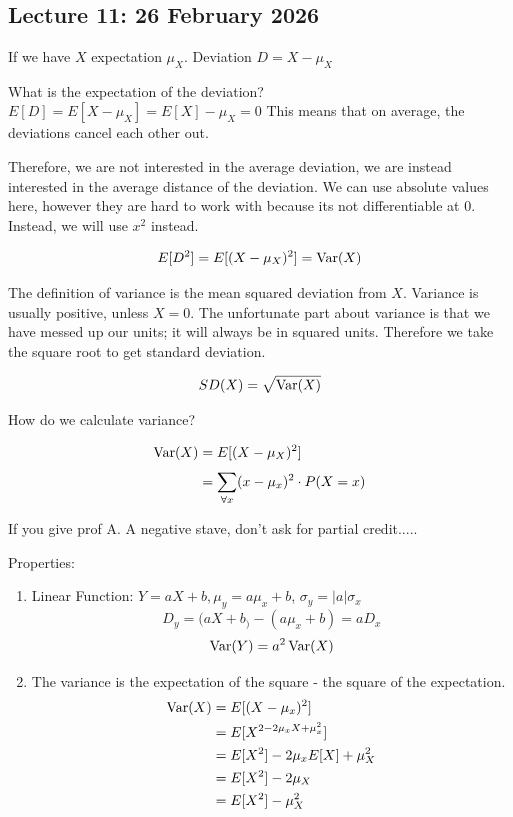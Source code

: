 \documentclass{report}
\begin{document}
\chapter{}
\section{Lecture 11: 26 February 2026}
If we have 
$ X $ expectation $ \mu _{X} $. Deviation $ D = X - \mu _{X} $ 

What is the expectation of the deviation? $ E[D] = E[X-\mu_{X}] = E[X] - \mu _{X} = 0 $ This means that on average, the deviations cancel each other out. 

Therefore, we are not interested in the average deviation, we are instead interested in the average distance of the deviation. We can use absolute values here, however they are hard to work with because its not differentiable at 0. Instead, we will use $ x^{2} $ instead. 


\begin{align*}
E[D^{2}] &=  E[(X-\mu _{X})^{2}] = \operatorname{Var}(X) \\
\end{align*}

The definition of variance is the mean squared deviation from $ X $. Variance is usually positive, unless $ X = 0 $. The unfortunate part about variance is that we have messed up our units; it will always be in squared units. Therefore we take the square root to get standard deviation. 

\[
	SD(X) = \sqrt{\operatorname{Var}(X)}
\]

How do we calculate variance? 

\begin{align*}
	\operatorname{Var}(X) &= E[(X-\mu _{X})^{2}] \\
	&= \sum_{\forall x}^{}(x-\mu _{x})^{2}\cdot P(X=x) \\
\end{align*}

If you give prof A. A negative stave, don't ask for partial credit.....


Properties: 
\begin{enumerate}
	\item Linear Function: $ Y=aX+b, \mu _{y} = a\mu _{x} + b $, $ \sigma_{y} = |a|\sigma_{x} $  
		\[
		D_{y} = (aX+b_) - (a\mu _{x} +b) = aD_{x}
		\]
		\[
		\operatorname{Var}(Y) = a^{2}\operatorname{Var}(X)
		\]
	\item The variance is the expectation of the square - the square of the expectation.  
		\begin{align*}
			\operatorname{Var}(X) &= E[(X-\mu _{x})^{2}]  \\
			&= E[X^{2 - 2\mu _{x}X + \mu _{x}^{2}}] \\
			&= E[X^{2}] -2\mu _{x}E[X] + \mu_{X}^{2} \\
			&= E[X^{2}] - 2\mu _{X} \\
			&= E[X^{2}] - \mu _{X}^{2} \\\\
		\end{align*}


\end{enumerate}
\end{document}
